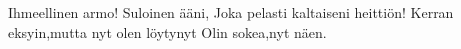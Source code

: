 Ihmeellinen armo!
Suloinen ääni,
Joka pelasti kaltaiseni heittiön!
Kerran eksyin,mutta nyt olen löytynyt
Olin sokea,nyt näen. 
